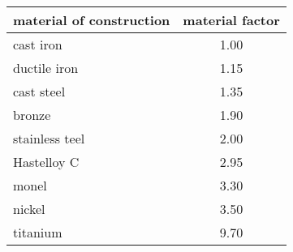 \begin{tabular}{lc}
	\footnotesize
	material of construction & material factor \\ \hline
	cast iron & 1.00 \\
	ductile iron & 1.15 \\
	cast steel & 1.35 \\
	bronze & 1.90 \\
	stainless teel & 2.00 \\
	Hastelloy C & 2.95 \\
	monel & 3.30 \\
	nickel & 3.50 \\
	titanium & 9.70 \\ \hline
\end{tabular}
